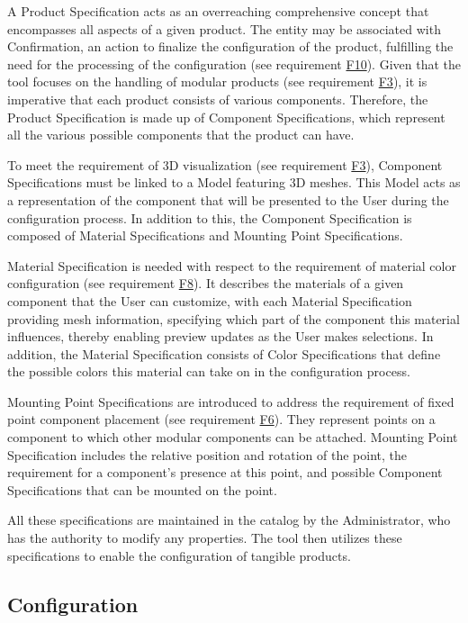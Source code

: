 A Product Specification acts as an overreaching comprehensive concept that encompasses all aspects of a given product. The entity may be associated with Confirmation, an action to finalize the configuration of the product, fulfilling the need for the processing of the configuration (see requirement \hyperref[itm:F10]{F10}). Given that the tool focuses on the handling of modular products (see requirement \hyperref[itm:F3]{F3}), it is imperative that each product consists of various components. Therefore, the Product Specification is made up of Component Specifications, which represent all the various possible components that the product can have.

To meet the requirement of 3D visualization (see requirement \hyperref[itm:F3]{F3}), Component Specifications must be linked to a Model featuring 3D meshes. This Model acts as a representation of the component that will be presented to the User during the configuration process. In addition to this, the Component Specification is composed of Material Specifications and Mounting Point Specifications.

Material Specification is needed with respect to the requirement of material color configuration (see requirement \hyperref[itm:F8]{F8}). It describes the materials of a given component that the User can customize, with each Material Specification providing mesh information, specifying which part of the component this material influences, thereby enabling preview updates as the User makes selections. In addition, the Material Specification consists of Color Specifications that define the possible colors this material can take on in the configuration process.

Mounting Point Specifications are introduced to address the requirement of fixed point component placement (see requirement \hyperref[itm:F6]{F6}). They represent points on a component to which other modular components can be attached. Mounting Point Specification includes the relative position and rotation of the point, the requirement for a component's presence at this point, and possible Component Specifications that can be mounted on the point.

All these specifications are maintained in the catalog by the Administrator, who has the authority to modify any properties. The tool then utilizes these specifications to enable the configuration of tangible products.


\subsection{Configuration}

